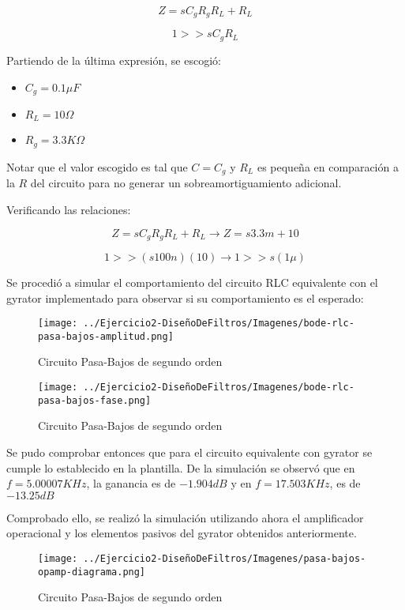 $$Z=sC_gR_gR_L+R_L$$

$$1 >> sC_gR_L$$

Partiendo de la última expresión, se escogió:

\begin{itemize}
	\item $C_g=0.1 \mu F$
	\item $R_L=10 \Omega$
	\item $R_g=3.3K \Omega$
\end{itemize}

Notar que el valor escogido es tal que $C=C_g$ y $R_L$ es pequeña en comparación a la $R$ del circuito para no generar
un sobreamortiguamiento adicional.

Verificando las relaciones:

$$Z=sC_gR_gR_L+R_L \longrightarrow Z = s3.3m + 10$$

$$1 >> (s100n)(10) \longrightarrow 1  >> s(1\mu)$$

Se procedió a simular el comportamiento del circuito RLC equivalente con el gyrator implementado para observar si su comportamiento es el esperado:


\begin{figure}[H]
    \centering
    \texttt{[image: ../Ejercicio2-DiseñoDeFiltros/Imagenes/bode-rlc-pasa-bajos-amplitud.png]}
    \caption{Circuito Pasa-Bajos de segundo orden}
\end{figure}

\begin{figure}[H]
    \centering
    \texttt{[image: ../Ejercicio2-DiseñoDeFiltros/Imagenes/bode-rlc-pasa-bajos-fase.png]}
    \caption{Circuito Pasa-Bajos de segundo orden}
\end{figure}

Se pudo comprobar entonces que para el circuito equivalente con gyrator se cumple lo establecido en la plantilla.
De la simulación se observó que en $f=5.00007 KHz$, la ganancia es de $-1.904 dB$ y en $f=17.503KHz$, es de $-13.25 dB$


Comprobado ello, se realizó la simulación utilizando ahora el amplificador operacional y los elementos pasivos del gyrator obtenidos anteriormente.

\begin{figure}[H]
    \centering
    \texttt{[image: ../Ejercicio2-DiseñoDeFiltros/Imagenes/pasa-bajos-opamp-diagrama.png]}
    \caption{Circuito Pasa-Bajos de segundo orden}
\end{figure}

